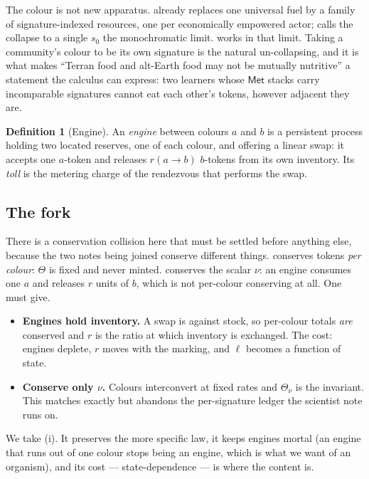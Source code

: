 \documentclass[11pt]{article}
\theoremstyle{plain}
\theoremstyle{definition}
\newtheorem{definition}[theorem]{Definition}
\theoremstyle{remark}
\newcommand{\Met}{\mathsf{Met}}
\begin{document}
The colour is not new apparatus. \cite{CARho} already replaces one
universal fuel by a family of signature-indexed resources, one per
economically empowered actor; \cite[\S6]{CARho} calls the collapse to a
single $s_0$ the monochromatic limit. \cite{compose} works in that limit.
Taking a community's colour to be its own signature is the natural
un-collapsing, and it is what makes ``Terran food and alt-Earth food may
not be mutually nutritive'' a statement the calculus can express: two
learners whose $\Met$ stacks carry incomparable signatures cannot eat each
other's tokens, however adjacent they are.

\begin{definition}[Engine]\label{def:engine}
An \emph{engine} between colours $a$ and $b$ is a persistent process
holding two located reserves, one of each colour, and offering a linear
swap: it accepts one $a$-token and releases $r(a{\to}b)$ $b$-tokens from
its own inventory. Its \emph{toll} is the metering charge of the rendezvous
that performs the swap.
\end{definition}

\subsection{The fork}

There is a conservation collision here that must be settled before
anything else, because the two notes being joined conserve different
things. \cite{compose} conserves tokens \emph{per colour}: $\Theta$ is
fixed and never minted. \cite{vtok} conserves the scalar $\nu$: an engine
consumes one $a$ and releases $r$ units of $b$, which is not per-colour
conserving at all. One must give.

\begin{itemize}[itemsep=3pt]
\item[(i)] \textbf{Engines hold inventory.} A swap is against stock, so
per-colour totals \emph{are} conserved and $r$ is the ratio at which
inventory is exchanged. The cost: engines deplete, $r$ moves with the
marking, and $\ell$ becomes a function of state.
\item[(ii)] \textbf{Conserve only $\nu$.} Colours interconvert at fixed
rates and $\Theta_\nu$ is the invariant. This matches \cite{vtok} exactly
but abandons the per-signature ledger the scientist note runs on.
\end{itemize}

We take (i). It preserves the more specific law, it keeps engines mortal
(an engine that runs out of one colour stops being an engine, which is what
we want of an organism), and its cost --- state-dependence --- is where the
content is.
\end{document}
